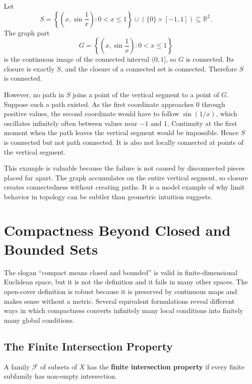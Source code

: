 \begin{example}
Let
\[
    S=\left\{\left(x,\sin\frac1x\right):0<x\leq 1\right\}
      \cup\left(\{0\}\times[-1,1]\right)\subseteq\mathbb{R}^2.
\]
The graph part
\[
    G=\left\{\left(x,\sin\frac1x\right):0<x\leq 1\right\}
\]
is the continuous image of the connected interval $(0,1]$, so $G$ is connected. Its closure is exactly $S$, and the closure of a connected set is connected. Therefore $S$ is connected.

However, no path in $S$ joins a point of the vertical segment to a point of $G$. Suppose such a path existed. As the first coordinate approaches $0$ through positive values, the second coordinate would have to follow $\sin(1/x)$, which oscillates infinitely often between values near $-1$ and $1$. Continuity at the first moment when the path leaves the vertical segment would be impossible. Hence $S$ is connected but not path connected. It is also not locally connected at points of the vertical segment.
\end{example}

\begin{remark}
This example is valuable because the failure is not caused by disconnected pieces placed far apart. The graph accumulates on the entire vertical segment, so closure creates connectedness without creating paths. It is a model example of why limit behavior in topology can be subtler than geometric intuition suggests.
\end{remark}

\section{Compactness Beyond Closed and Bounded Sets}

The slogan ``compact means closed and bounded'' is valid in finite-dimensional Euclidean space, but it is not the definition and it fails in many other spaces. The open-cover definition is robust because it is preserved by continuous maps and makes sense without a metric. Several equivalent formulations reveal different ways in which compactness converts infinitely many local conditions into finitely many global conditions.

\subsection{The Finite Intersection Property}

\begin{definition}
A family $\mathcal{F}$ of subsets of $X$ has the \textbf{finite intersection property} if every finite subfamily has non-empty intersection.
\end{definition}


